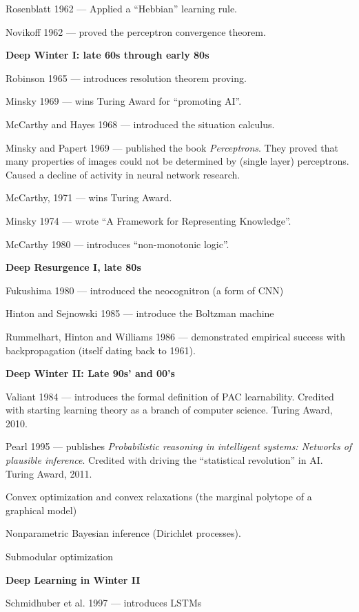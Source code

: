 \documentclass[landscape]{article}
\newcommand{\slide}[1]{\vfill
\eject
\centerline{\bf #1}
\vfill}
\begin{document}
{Rosenblatt 1962 --- Applied a ``Hebbian'' learning rule.

\vfill
Novikoff 1962 --- proved the perceptron convergence theorem.

\slide{Deep Winter I: late 60s through early 80s}

Robinson 1965 --- introduces resolution theorem proving.

\vfill
Minsky 1969 --- wins Turing Award for ``promoting AI''.

\vfill
McCarthy and Hayes 1968 --- introduced the situation calculus.

\vfill
Minsky and Papert 1969 --- published the book {\it Perceptrons}.
They proved that many properties of images could not be determined by (single layer) perceptrons.
Caused a decline of activity in neural network research.

\vfill
McCarthy, 1971 --- wins Turing Award.

\vfill
Minsky 1974 --- wrote ``A Framework for Representing Knowledge''.

\vfill
McCarthy 1980 --- introduces ``non-monotonic logic''.

\slide{Deep Resurgence I, late 80s}

Fukushima 1980 --- introduced the neocognitron (a form of CNN)

\vfill
Hinton and Sejnowski 1985 --- introduce the Boltzman machine

\vfill
Rummelhart, Hinton and Williams 1986 --- demonstrated empirical success with backpropagation (itself dating back to 1961).

\slide{Deep Winter II: Late 90s' and 00's}

Valiant 1984 --- introduces the formal definition of PAC learnability.  Credited with starting learning theory as a branch of
computer science.  Turing Award, 2010.

\vfill
Pearl 1995 --- publishes {\it Probabilistic reasoning in intelligent systems: Networks of plausible inference}. Credited with driving the
``statistical revolution'' in AI.  Turing Award, 2011.

\vfill
Convex optimization and convex relaxations (the marginal polytope of a graphical model)

\vfill
Nonparametric Bayesian inference (Dirichlet processes).

\vfill
Submodular optimization

\slide{Deep Learning in Winter II}

Schmidhuber et al. 1997 --- introduces LSTMs

}
\end{document}
